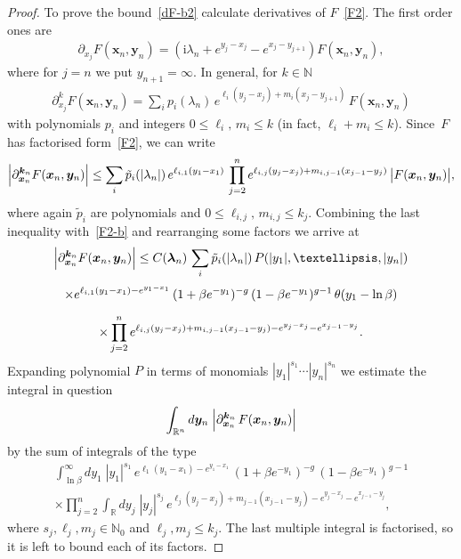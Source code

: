 \documentclass[10pt,a4paper]{amsart}
\renewcommand{\imath}{\mathrm{i}}
\begin{document}
\begin{proof}
	To prove the bound~\eqref{dF-b2} calculate derivatives of $F$~\eqref{F2}. The first order ones are
	\begin{align}
		\partial_{x_j} F(\bm{x}_n, \bm{y}_{n}) = (\imath \lambda_n + e^{y_{j} - x_j} - e^{x_j - y_{j + 1}} ) F(\bm{x}_n, \bm{y}_{n}),
	\end{align}
	where for $j = n$ we put $y_{n + 1} = \infty$. In general, for $k\in \mathbb{N}$
	\begin{align}
		\partial_{x_j}^{k} F(\bm{x}_n, \bm{y}_{n }) = \sum_{i} p_i(\lambda_n) \, e^{\ell_i (y_{j} - x_j) + m_i (x_j - y_{j + 1})} \, F(\bm{x}_n, \bm{y}_{n})
	\end{align}
	with polynomials $p_i$ and integers $0 \leq \ell_i, \, m_i \leq k$ (in fact, $\ell_i + m_i \leq k$). Since~$F$ has factorised form~\eqref{F2}, we can write
	\begin{align} \label{dF-b}
		\Bigl| \partial_{\bm{x}_n}^{\bm{k}_n} F(\bm{x}_n, \bm{y}_{n}) \Bigr| \leq \sum_{i} \tilde{p}_i(|\lambda_n|) \, e^{\ell_{i,1} (y_1 - x_1)} \, \prod_{j = 2}^{n} e^{\ell_{i,j} (y_{j} - x_j) + m_{i,j-1} (x_{j - 1} - y_{j}) } \, \bigl|  F(\bm{x}_n, \bm{y}_{n}) \bigr|,
	\end{align}
	where again $\tilde{p}_i$ are polynomials and $0 \leq \ell_{i,j}, \, m_{i,j} \leq k_j$. Combining the last inequality with~\eqref{F2-b} and rearranging some factors we arrive at
	\begin{multline} \label{dF2-b}
		\Bigl| \partial_{\bm{x}_n}^{\bm{k}_n} F(\bm{x}_n, \bm{y}_{n}) \Bigr| \leq C(\bm{\lambda}_{n}) \, \sum_{i} \tilde{p}_i(|\lambda_n|) \, P(|y_1|, \dots, |y_n|) \\[2pt]
		\times e^{\ell_{i,1} (y_1 - x_1) - e^{y_1 - x_1}} \, (1 + \beta e^{-y_1})^{- g} \, (1 - \beta e^{-y_1})^{g - 1} \, \theta(y_1 - \ln \beta) \\[6pt]
		\times \prod_{j = 2}^{n} e^{\ell_{i,j} (y_{j} - x_j) + m_{i,j-1} (x_{j - 1} - y_{j}) - e^{y_j - x_j} - e^{x_{j - 1} - y_{j}} }.
	\end{multline}
	Expanding polynomial $P$ in terms of monomials $|y_1|^{s_1} \cdots |y_n|^{s_n}$ we estimate the integral in question
	\begin{align}
		\int_{\mathbb{R}^n} d\bm{y}_n \; \Bigl| \partial_{\bm{x}_n}^{\bm{k}_n} \, F (\bm{x}_n, \bm{y}_n) \Bigr| 
	\end{align}
	by the sum of integrals of the type
	\begin{multline}\label{intF-b}
		\int_{\ln \beta}^\infty dy_1 \; |y_1|^{s_1} \, e^{\ell_{1} (y_1 - x_1) - e^{y_1 - x_1}} \, (1 + \beta e^{-y_1})^{- g} \, (1 - \beta e^{-y_1})^{g - 1} \\[3pt]
		\times \prod_{j = 2}^{n} \int_{\mathbb{R}} dy_j \; |y_j|^{s_j} \,  e^{\ell_{j} (y_{j} - x_j) + m_{j-1} (x_{j - 1} - y_{j}) - e^{y_j - x_j} - e^{x_{j - 1} - y_{j}} },
	\end{multline}
	where $s_j, \ell_j, m_j \in \mathbb{N}_0$ and $\ell_j, m_j \leq k_j$. The last multiple integral is factorised, so it is left to bound each of its factors. 
	

\end{proof}
\end{document}
